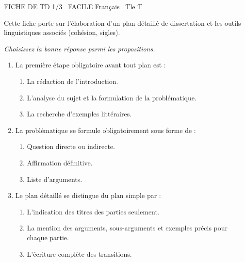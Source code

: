 \documentclass[11pt]{article}
\begin{document}
\begin{tcolorbox}[enhanced,colback=popink,colframe=popink,arc=10pt,boxrule=0pt,left=12pt,right=12pt,top=9pt,bottom=9pt]
{\color{white}\popxbold\small FICHE DE TD 1/3 \textbullet\ FACILE \hfill Français \textbullet\ Tle T\par}
\end{tcolorbox}
\vspace{4pt}
Cette fiche porte sur l'élaboration d'un plan détaillé de dissertation et les outils linguistiques associés (cohésion, sigles).

\begin{exercice}
\emph{Choisissez la bonne réponse parmi les propositions.}
\begin{enumerate}
    \item La première étape obligatoire avant tout plan est :
    \begin{enumerate}
        \item La rédaction de l'introduction.
        \item L'analyse du sujet et la formulation de la problématique.
        \item La recherche d'exemples littéraires.
    \end{enumerate}
    \item La problématique se formule obligatoirement sous forme de :
    \begin{enumerate}
        \item Question directe ou indirecte.
        \item Affirmation définitive.
        \item Liste d'arguments.
    \end{enumerate}
    \item Le plan détaillé se distingue du plan simple par :
    \begin{enumerate}
        \item L'indication des titres des parties seulement.
        \item La mention des arguments, sous-arguments et exemples précis pour chaque partie.
        \item L'écriture complète des transitions.
    \end{enumerate}
\end{enumerate}
\end{exercice}
\end{document}
